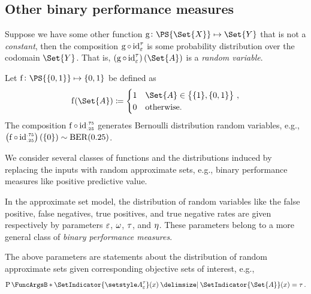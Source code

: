 \documentclass[10pt,final,hidelinks]{article}
\numberwithin{equation}{section}
\begin{document}
\subsection{Other binary performance measures}
\label{sec:perf}
Suppose we have some other function $\Fun{g} \colon \PS{\Set{X}} \mapsto \Set{Y}$ that is not a \emph{constant}, then the composition $\Fun{g} \circ \APFun{id}[\fprate][\tprate]$ is some probability distribution over the codomain $\Set{Y}$.
That is, $\left(\Fun{g} \circ \APFun{id}[\fprate][\tprate]\right)(\Set{A})$ is a \emph{random variable}.
\begin{example}
	Let $\Fun{f} \colon \PS{\{0,1\}} \mapsto \{0,1\}$ be defined as
	\begin{equation}
	\Fun{f}(\Set{A}) \coloneqq
	\begin{cases}
	1 & \Set{A} \in \left\{\{1\},\{0,1\}\right\}\,,\\
	0 & \text{otherwise.}
	\end{cases}
	\end{equation}
	The composition $\Fun{f} \circ \APFun{id}[\mathsmaller{.25}][\mathsmaller{.75}]$ generates Bernoulli distribution random variables, e.g., $\left(\Fun{f} \circ \APFun{id}[\mathsmaller{.25}][\mathsmaller{.75}]\right)(\{0\}) \sim \berdist(0.25)$.
\end{example}

We consider several classes of functions and the distributions induced by replacing the inputs with random approximate sets, e.g., binary performance measures like positive predictive value.


In the approximate set model, the distribution of random variables like the false positive, false negatives, true positives, and true negative rates are given respectively by parameters $\varepsilon$, $\omega$, $\tau$, and $\eta$.
These parameters belong to a more general class of \emph{binary performance measures}.

The above parameters are statements about the distribution of random approximate sets given corresponding objective sets of interest, e.g.,
\begin{equation}
\Prob{\SetIndicator{\ASet{A}[\fprate][\tprate]}(x) \Given 
	\SetIndicator{\Set{A}}(x)} = \tprate\,.
\end{equation}
\end{document}
